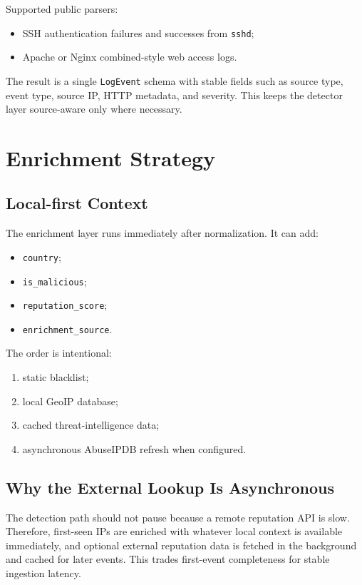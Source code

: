 \documentclass[11pt,a4paper]{article}
\begin{document}
Supported public parsers:

\begin{itemize}[leftmargin=1.5em]
  \item SSH authentication failures and successes from \texttt{sshd};
  \item Apache or Nginx combined-style web access logs.
\end{itemize}

The result is a single \texttt{LogEvent} schema with stable fields such as source type, event type, source IP, HTTP metadata, and severity. This keeps the detector layer source-aware only where necessary.

\section{Enrichment Strategy}

\subsection{Local-first Context}

The enrichment layer runs immediately after normalization. It can add:

\begin{itemize}[leftmargin=1.5em]
  \item \texttt{country};
  \item \texttt{is\_malicious};
  \item \texttt{reputation\_score};
  \item \texttt{enrichment\_source}.
\end{itemize}

The order is intentional:

\begin{enumerate}[leftmargin=1.5em]
  \item static blacklist;
  \item local GeoIP database;
  \item cached threat-intelligence data;
  \item asynchronous AbuseIPDB refresh when configured.
\end{enumerate}

\subsection{Why the External Lookup Is Asynchronous}

The detection path should not pause because a remote reputation API is slow. Therefore, first-seen IPs are enriched with whatever local context is available immediately, and optional external reputation data is fetched in the background and cached for later events. This trades first-event completeness for stable ingestion latency.
\end{document}
